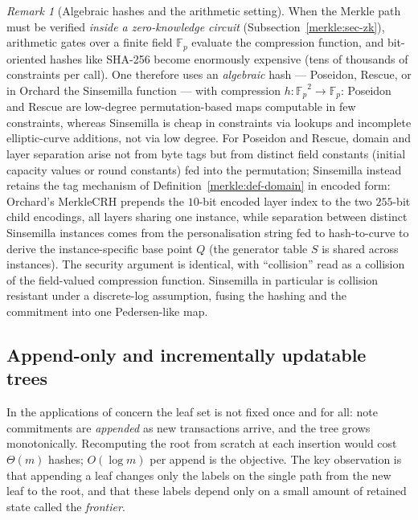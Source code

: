 \documentclass[11pt,a4paper]{article}
\theoremstyle{definition}
\theoremstyle{remark}
\newtheorem{remark}[theorem]{Remark}
\newcommand{\Fp}{\ensuremath{\mathbb{F}_{p}}}
\begin{document}
\begin{remark}[Algebraic hashes and the arithmetic setting]\label{merkle:rem-poseidon}
When the Merkle path must be verified \emph{inside a zero-knowledge circuit} (Subsection~\ref{merkle:sec-zk}), arithmetic gates over a finite field \(\Fp\) evaluate the compression function, and bit-oriented hashes like SHA-256 become enormously expensive (tens of thousands of constraints per call). One therefore uses an \emph{algebraic} hash --- Poseidon, Rescue, or in Orchard the Sinsemilla function --- with compression \(h \colon \Fp^2 \to \Fp\): Poseidon and Rescue are low-degree permutation-based maps computable in few constraints, whereas Sinsemilla is cheap in constraints via lookups and incomplete elliptic-curve additions, not via low degree. For Poseidon and Rescue, domain and layer separation arise not from byte tags but from distinct field constants (initial capacity values or round constants) fed into the permutation; Sinsemilla instead retains the tag mechanism of Definition~\ref{merkle:def-domain} in encoded form: Orchard's MerkleCRH prepends the \(10\)-bit encoded layer index to the two \(255\)-bit child encodings, all layers sharing one instance, while separation between distinct Sinsemilla instances comes from the personalisation string fed to hash-to-curve to derive the instance-specific base point \(Q\) (the generator table \(S\) is shared across instances). The security argument is identical, with ``collision'' read as a collision of the field-valued compression function. Sinsemilla in particular is collision resistant under a discrete-log assumption, fusing the hashing and the commitment into one Pedersen-like map.
\end{remark}

\subsection{Append-only and incrementally updatable trees}\label{merkle:sec-frontier}

In the applications of concern the leaf set is not fixed once and for all: note commitments are \emph{appended} as new transactions arrive, and the tree grows monotonically. Recomputing the root from scratch at each insertion would cost \(\Theta(m)\) hashes; \(O(\log m)\) per append is the objective. The key observation is that appending a leaf changes only the labels on the single path from the new leaf to the root, and that these labels depend only on a small amount of retained state called the \emph{frontier}.
\end{document}
